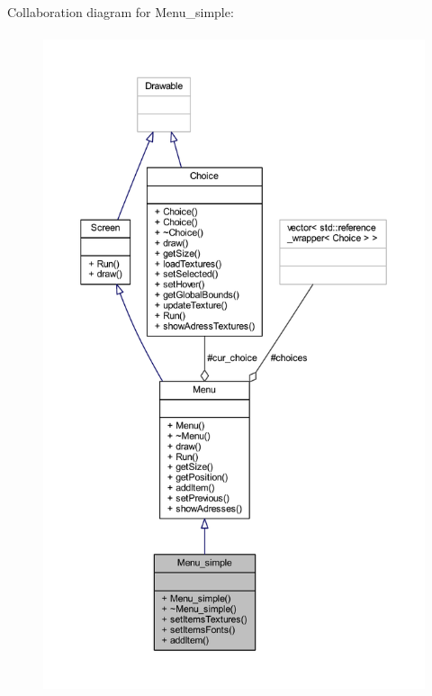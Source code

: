 Collaboration diagram for Menu\+\_\+simple\+:
\nopagebreak
\begin{figure}[H]
\begin{center}
\leavevmode
\includegraphics[height=550pt]{class_menu__simple__coll__graph}
\end{center}
\end{figure}
